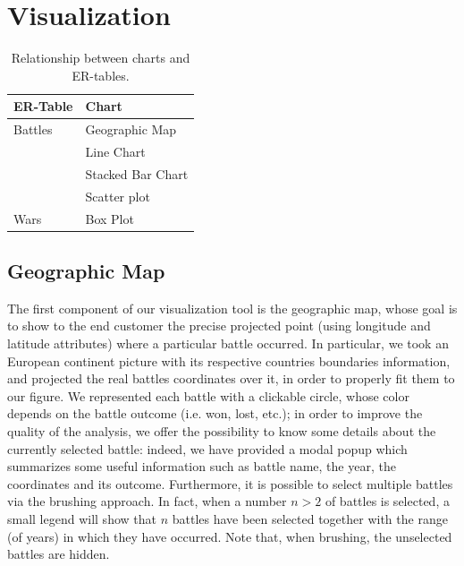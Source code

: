 \section{Visualization}\label{sec:visualization}

\begin{table}[h]
    \caption{Relationship between charts and ER-tables.}
    \centering
    \begin{tabular}{ll}
        \toprule
        ER-Table & Chart             \\
        \midrule
        Battles  & Geographic Map    \\
                 & Line Chart        \\
                 & Stacked Bar Chart \\
                 & Scatter plot      \\
        Wars     & Box Plot          \\
        \bottomrule
    \end{tabular}
\end{table}

\subsection{Geographic Map}
The first component of our visualization tool is the geographic map, whose goal is to show to the end customer the precise projected point (using longitude and latitude attributes) where a particular battle occurred.
In particular, we took an European continent picture with its respective countries boundaries information, and projected the real battles coordinates over it, in order to properly fit them to our figure.
We represented each battle with a clickable circle, whose color depends on the battle outcome (i.e. won, lost, etc.); in order to improve the quality of the analysis, we offer the possibility to know some details about the currently selected battle: indeed, we have provided a modal popup which summarizes some useful information such as battle name, the year, the coordinates and its outcome.
Furthermore, it is possible to select multiple battles via the brushing approach.
In fact, when a number $n > 2$ of battles is selected, a small legend will show that $n$ battles have been selected together with the range (of years) in which they have occurred.
Note that, when brushing, the unselected battles are hidden.

